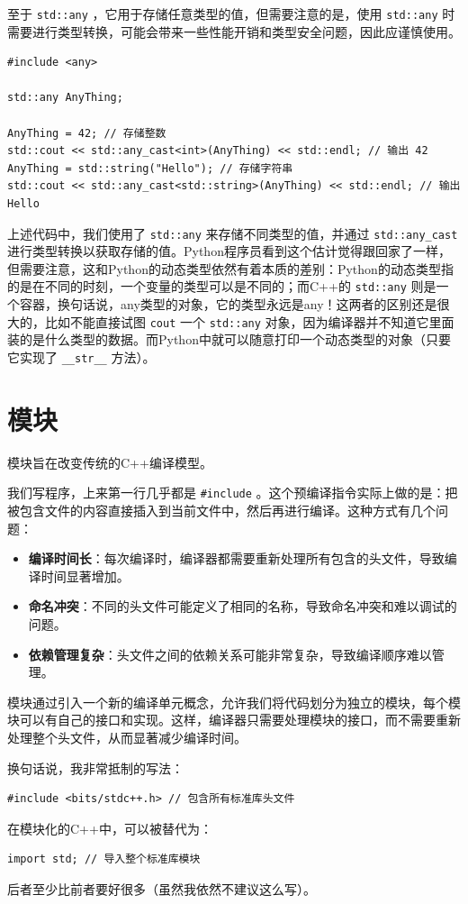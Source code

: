 至于 \verb|std::any| ，它用于存储任意类型的值，但需要注意的是，使用 \verb|std::any| 时需要进行类型转换，可能会带来一些性能开销和类型安全问题，因此应谨慎使用。
\begin{verbatim}
#include <any>

std::any AnyThing;

AnyThing = 42; // 存储整数
std::cout << std::any_cast<int>(AnyThing) << std::endl; // 输出 42
AnyThing = std::string("Hello"); // 存储字符串
std::cout << std::any_cast<std::string>(AnyThing) << std::endl; // 输出 Hello
\end{verbatim}
上述代码中，我们使用了 \verb|std::any| 来存储不同类型的值，并通过 \verb|std::any_cast| 进行类型转换以获取存储的值。Python程序员看到这个估计觉得跟回家了一样，但需要注意，这和Python的动态类型依然有着本质的差别：Python的动态类型指的是在不同的时刻，一个变量的类型可以是不同的；而C++的 \verb|std::any| 则是一个容器，换句话说，any类型的对象，它的类型永远是any！这两者的区别还是很大的，比如不能直接试图 \verb|cout| 一个 \verb|std::any| 对象，因为编译器并不知道它里面装的是什么类型的数据。而Python中就可以随意打印一个动态类型的对象（只要它实现了 \verb|__str__| 方法）。

\section{模块}

模块旨在改变传统的C++编译模型。

我们写程序，上来第一行几乎都是 \verb|#include| 。这个预编译指令实际上做的是：把被包含文件的内容直接插入到当前文件中，然后再进行编译。这种方式有几个问题：
\begin{itemize}
    \item \textbf{编译时间长}：每次编译时，编译器都需要重新处理所有包含的头文件，导致编译时间显著增加。
    \item \textbf{命名冲突}：不同的头文件可能定义了相同的名称，导致命名冲突和难以调试的问题。
    \item \textbf{依赖管理复杂}：头文件之间的依赖关系可能非常复杂，导致编译顺序难以管理。
\end{itemize}

模块通过引入一个新的编译单元概念，允许我们将代码划分为独立的模块，每个模块可以有自己的接口和实现。这样，编译器只需要处理模块的接口，而不需要重新处理整个头文件，从而显著减少编译时间。

换句话说，我非常抵制的写法：
\begin{verbatim}
#include <bits/stdc++.h> // 包含所有标准库头文件
\end{verbatim}
在模块化的C++中，可以被替代为：
\begin{verbatim}
import std; // 导入整个标准库模块
\end{verbatim}
后者至少比前者要好很多（虽然我依然不建议这么写）。

